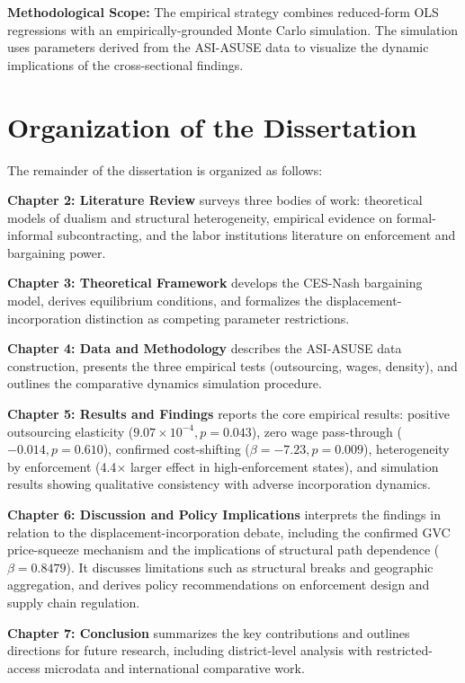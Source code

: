 \textbf{Methodological Scope:} The empirical strategy combines reduced-form OLS regressions with an empirically-grounded Monte Carlo simulation. The simulation uses parameters derived from the ASI-ASUSE data to visualize the dynamic implications of the cross-sectional findings.

\section{Organization of the Dissertation}

The remainder of the dissertation is organized as follows:

\textbf{Chapter 2: Literature Review} surveys three bodies of work: theoretical models of dualism and structural heterogeneity, empirical evidence on formal-informal subcontracting, and the labor institutions literature on enforcement and bargaining power.

\textbf{Chapter 3: Theoretical Framework} develops the CES-Nash bargaining model, derives equilibrium conditions, and formalizes the displacement-incorporation distinction as competing parameter restrictions.

\textbf{Chapter 4: Data and Methodology} describes the ASI-ASUSE data construction, presents the three empirical tests (outsourcing, wages, density), and outlines the comparative dynamics simulation procedure.

\textbf{Chapter 5: Results and Findings} reports the core empirical results: positive outsourcing elasticity ($9.07 \times 10^{-4}, p=0.043$), zero wage pass-through ($-0.014, p=0.610$), confirmed cost-shifting ($\beta = -7.23, p = 0.009$), heterogeneity by enforcement (4.4$\times$ larger effect in high-enforcement states), and simulation results showing qualitative consistency with adverse incorporation dynamics.

\textbf{Chapter 6: Discussion and Policy Implications} interprets the findings in relation to the displacement-incorporation debate, including the confirmed GVC price-squeeze mechanism and the implications of structural path dependence ($\beta=0.8479$). It discusses limitations such as structural breaks and geographic aggregation, and derives policy recommendations on enforcement design and supply chain regulation.

\textbf{Chapter 7: Conclusion} summarizes the key contributions and outlines directions for future research, including district-level analysis with restricted-access microdata and international comparative work.
